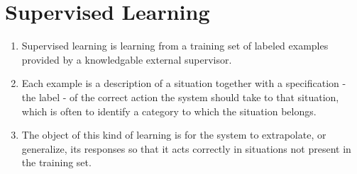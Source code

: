 \section{Supervised Learning}\label{Supervised Learning}

\begin{enumerate}
    \item Supervised learning is learning from a training set of labeled examples provided by a knowledgable external supervisor. \cite{drl-1}

    \item Each example is a description of a situation together with a specification - the label - of the correct action the system should take to that situation, which is often to identify a category to which the situation belongs. \cite{drl-1}
    
    \item The object of this kind of learning is for the system to extrapolate, or generalize, its responses so that it acts correctly in situations not present in the training set. \cite{drl-1}

    
\end{enumerate}